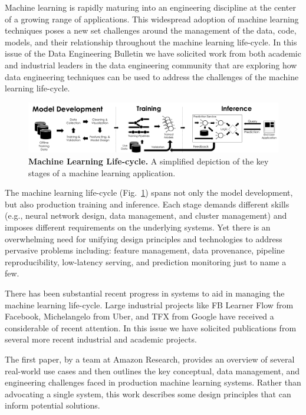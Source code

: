 \documentclass[11pt]{article}
\begin{document}
Machine learning is rapidly maturing into an engineering discipline at the center of a growing range of applications.
This widespread adoption of machine learning techniques poses a new set challenges around the management of the data, code, models, and their relationship throughout the machine learning life-cycle.
In this issue of the Data Engineering Bulletin we have solicited work from both academic and industrial leaders in the data engineering community that are exploring how data engineering techniques can be used to address the challenges of the machine learning life-cycle.




\begin{figure}[h]
\centering
\includegraphics[width=\textwidth]{letters/pipeline.pdf}
\caption{\small \textbf{Machine Learning Life-cycle.} A simplified depiction of the key stages of a machine learning application.}
\label{fig:mllc}
\end{figure}


The machine learning life-cycle (Fig.~\ref{fig:mllc}) spans not only the model development, but also production training and inference.
Each stage demands different skills (e.g., neural network design, data management, and cluster management) and imposes different requirements on the underlying systems.
Yet there is an overwhelming need for unifying design principles and technologies to address pervasive problems including: feature management, data provenance, pipeline reproducibility, low-latency serving, and prediction monitoring just to name a few.


There has been substantial recent progress in systems to aid in managing the machine learning life-cycle.  
Large industrial projects like 
FB Learner Flow 
from Facebook, 
Michelangelo 
from Uber, and 
TFX 
from Google have received a considerable of recent attention.  
In this issue we have solicited publications from several more recent industrial and academic projects.

The first paper, by a team at Amazon Research, provides an overview of several real-world use cases and then outlines the key conceptual, data management, and engineering challenges faced in production machine learning systems.
Rather than advocating a single system, this work describes some design principles that can inform potential solutions.
\end{document}
